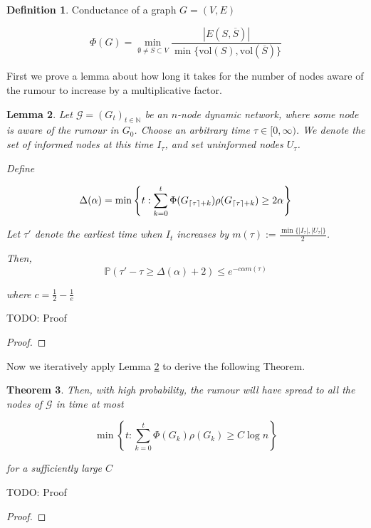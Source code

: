\documentclass[a4paper,11pt]{article}
\newtheorem{theorem}{Theorem}[section]
\newtheorem{lemma}[theorem]{Lemma}
\theoremstyle{definition}
\newtheorem{definition}[theorem]{Definition}
\newcommand*\comp[1]{\overline{#1}}
\DeclarePairedDelimiter\ceil{\lceil}{\rceil}
\begin{document}
\begin{definition}
	Conductance of a graph $G = (V, E)$

	$$
		\Phi(G) = \min_{\emptyset \neq S \subset V} \frac{|E(S, \comp{S})|}{\min\{\text{vol}(S), \text{vol}(\comp{S})\}}
	$$
\end{definition}


First we prove a lemma about how long it takes for the number of nodes aware of the rumour to increase by a multiplicative factor. 

\begin{lemma} \label{AsyncIncreaseLemma}
	Let $\mathcal{G}=(G_t)_{t \in \mathbb{N}}$ be an $n$-node dynamic network, where some node is aware of the rumour in $G_0$. Choose an arbitrary time $\tau \in [0, \infty)$. We denote the set of informed nodes at this time $I_\tau$, and set uninformed nodes $U_\tau$.

	Define 
	
	$$
	\Delta(\alpha) = \min \left\{t: \sum_{k=0}^t \Phi(G_{\ceil{\tau}+k})\rho(G_{\ceil{\tau}+k}) \geq 2 \alpha \right\}
	$$

	Let $\tau'$ denote the earliest time when $I_t$ increases by $m(\tau) := \frac{\min\{|I_\tau|, |U_\tau|\}}{2}$.

	Then, 
	$$
		\mathbb{P}(\tau' - \tau \geq \Delta(\alpha) + 2) \leq e^{-c\alpha m(\tau)}
	$$

	where $c = \frac{1}{2} - \frac{1}{e}$
\end{lemma}

TODO: Proof

\begin{proof}
	
\end{proof}

Now we iteratively apply Lemma \ref{AsyncIncreaseLemma} to derive the following Theorem.

\begin{theorem}
	\ModelIntro Then, with high probability, the rumour will have spread to all the nodes of $\mathcal{G}$ in time at most

	$$
		\min \left\{t : \sum_{k=0}^t \Phi(G_k)\rho(G_k) \geq C \log n \right\} 
	$$

	\noindent
	for a sufficiently large $C$
\end{theorem}

TODO: Proof

\begin{proof}

\end{proof}
\end{document}
